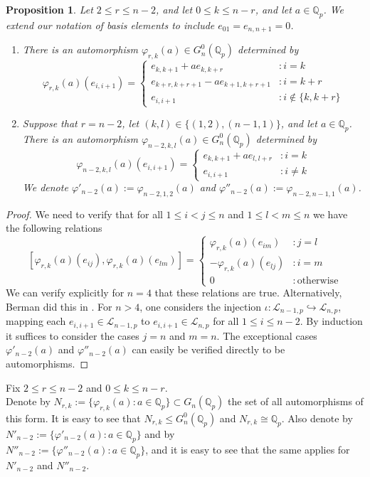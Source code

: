 \documentclass[12pt]{article}
\newtheorem{proposition2}[theorem2]{Proposition}
\begin{document}
\begin{proposition2}
\label{phi.r.k}
Let $2\leq{r}\leq{n-2}$, and let $0\leq{k}\leq{n-r}$, and let $a\in\mathbb{Q}_{p}$. We extend our notation of basis elements to include $e_{01}=e_{n,n+1}=0$.
\begin{enumerate}
\item There is an automorphism $\varphi_{r,k}(a)\in{G_{n}^{0}(\mathbb{Q}_{p})}$ determined by \[
    \varphi_{r,k}(a)(e_{i,i+1})=\begin{cases}
        e_{k,k+1}+a{e_{k,k+r}} & : i=k\\
        e_{k+r,k+r+1}-a{e_{k+1,k+r+1}} & : i=k+r\\
        e_{i,i+1} & : i\notin\{k,k+r\}
    \end{cases}
\]
\item Suppose that $r=n-2$, let $(k,l)\in\{(1,2),(n-1,1)\}$, and let $a\in\mathbb{Q}_{p}$. There is an automorphism $\varphi_{n-2,k,l}(a)\in{G_{n}^{0}(\mathbb{Q}_{p})}$ determined by \[
    \varphi_{n-2,k,l}(a)(e_{i,i+1})=\begin{cases}
        e_{k,k+1}+a{e_{l,l+r}} & : i=k\\
        e_{i,i+1} & : i\neq{k}
    \end{cases}
\]
    We denote $\varphi'_{n-2}(a):=\varphi_{n-2,1,2}(a)$ and $\varphi''_{n-2}(a):=\varphi_{n-2,n-1,1}(a)$.
\end{enumerate}
\end{proposition2}
\begin{proof}
We need to verify that for all $1\leq{i<j}\leq{n}$ and $1\leq{l<m}\leq{n}$ we have the following relations \[
    [\varphi_{r,k}(a)(e_{ij}),\varphi_{r,k}(a)(e_{lm})]=\begin{cases}
    \varphi_{r,k}(a)(e_{im}) & : j=l\\
        -\varphi_{r,k}(a)(e_{lj}) & : i=m\\
        0 & : \mathrm{otherwise}
    \end{cases}
\]
We can verify explicitly for $n=4$ that these relations are true. Alternatively, Berman did this in \cite[\S{3.3.7}]{BermanThesis}. For $n>4$, one considers the injection $\iota:\mathcal{L}_{n-1,p}\hookrightarrow\mathcal{L}_{n,p}$, mapping each $e_{i,i+1}\in\mathcal{L}_{n-1,p}$ to $e_{i,i+1}\in\mathcal{L}_{n,p}$ for all $1\leq{i}\leq{n-2}$. By induction it suffices to consider the cases $j=n$ and $m=n$. The exceptional cases $\varphi'_{n-2}(a)$ and $\varphi''_{n-2}(a)$ can easily be verified directly to be automorphisms.
\end{proof}
Fix $2\leq{r}\leq{n-2}$ and $0\leq{k}\leq{n-r}$.\\ Denote by $N_{r,k}:=\{\varphi_{r,k}(a) : a\in\mathbb{Q}_{p}\}\subset{G_{n}(\mathbb{Q}_{p})}$ the set of all automorphisms of this form. It is easy to see that $N_{r,k}\leq{G_{n}^{0}(\mathbb{Q}_{p})}$ and $N_{r,k}\cong\mathbb{Q}_{p}$.
Also denote by $N'_{n-2}:=\{\varphi'_{n-2}(a) : a\in\mathbb{Q}_{p}\}$ and by\\ $N''_{n-2}:=\{\varphi''_{n-2}(a) : a\in\mathbb{Q}_{p}\}$, and it is easy to see that the same applies for $N'_{n-2}$ and $N''_{n-2}$.
\end{document}
